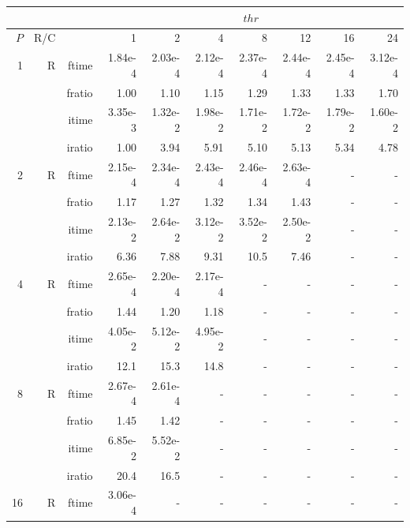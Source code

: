 \documentclass[a4paper]{article}
\begin{document}
\begin{table}[htbp]
\begin{center}
\begin{small}
\begin{tabular}{|r|r|r|r|r|r|r|r|r|r|}
\hline 
     & & & \multicolumn{7}{c|}{$thr$} \\ \hline
    $P$ & R/C &  & 1           & 2    & 4    & 8    & 12   & 16    & 24  \\ \hline\hline
   1 &  R &  ftime &   1.84e-4 &   2.03e-4 &   2.12e-4 &   2.37e-4 &   2.44e-4 &   2.45e-4 &   3.12e-4 \\
           &          & fratio &   1.00 &   1.10 &   1.15 &   1.29 &   1.33 &   1.33 &   1.70 \\
           &          & itime &   3.35e-3 &   1.32e-2 &   1.98e-2 &   1.71e-2 &   1.72e-2 &   1.79e-2 &   1.60e-2 \\
           &          & iratio &   1.00 &   3.94 &   5.91 &   5.10 &   5.13 &   5.34 &   4.78 \\\hline
   2 &  R &  ftime &   2.15e-4 &   2.34e-4 &   2.43e-4 &   2.46e-4 &   2.63e-4 &  - &  - \\
           &          & fratio &   1.17 &   1.27 &   1.32 &   1.34 &   1.43 &  - &  - \\
           &          & itime &   2.13e-2 &   2.64e-2 &   3.12e-2 &   3.52e-2 &   2.50e-2 &  - &  - \\
           &          & iratio &   6.36 &   7.88 &   9.31 &   10.5 &   7.46 &  - &  - \\\hline
   4 &  R &  ftime &   2.65e-4 &   2.20e-4 &   2.17e-4 &  - &  - &  - &  - \\
           &          & fratio &   1.44 &   1.20 &   1.18 &  - &  - &  - &  - \\
           &          & itime &   4.05e-2 &   5.12e-2 &   4.95e-2 &  - &  - &  - &  - \\
           &          & iratio &   12.1 &   15.3 &   14.8 &  - &  - &  - &  - \\\hline
   8 &  R &  ftime &   2.67e-4 &   2.61e-4 &  - &  - &  - &  - &  - \\
           &          & fratio &   1.45 &   1.42 &  - &  - &  - &  - &  - \\
           &          & itime &   6.85e-2 &   5.52e-2 &  - &  - &  - &  - &  - \\
           &          & iratio &   20.4 &   16.5 &  - &  - &  - &  - &  - \\\hline
   16 & R &  ftime &   3.06e-4 &  - &  - &  - &  - &  - &  - \\

\end{tabular}
\end{small}
\end{center}
\end{table}
\end{document}
